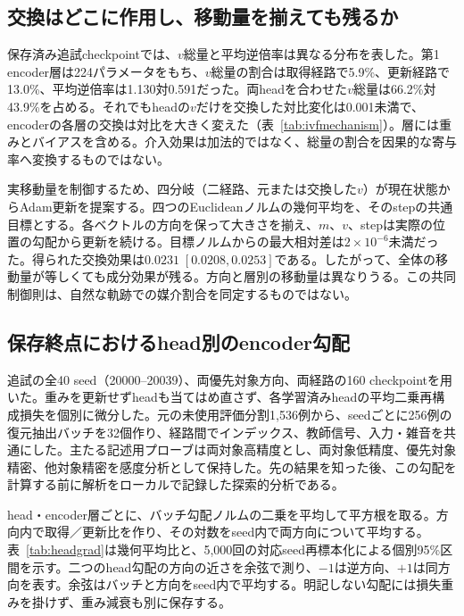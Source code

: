 \subsection{交換はどこに作用し、移動量を揃えても残るか}
保存済み追試checkpointでは、$v$総量と平均逆倍率は異なる分布を表した。第1 encoder層は224パラメータをもち、$v$総量の割合は取得経路で5.9\%、更新経路で13.0\%、平均逆倍率は1.130対0.591だった。両headを合わせた$v$総量は66.2\%対43.9\%を占める。それでもheadの$v$だけを交換した対比変化は0.001未満で、encoderの各層の交換は対比を大きく変えた（表~\ref{tab:ivfmechanism}）。層には重みとバイアスを含める。介入効果は加法的ではなく、総量の割合を因果的な寄与率へ変換するものではない。

実移動量を制御するため、四分岐（二経路、元または交換した$v$）が現在状態からAdam更新を提案する。四つのEuclideanノルムの幾何平均を、そのstepの共通目標とする。各ベクトルの方向を保って大きさを揃え、$m$、$v$、stepは実際の位置の勾配から更新を続ける。目標ノルムからの最大相対差は$2\times10^{-6}$未満だった。得られた交換効果は$0.0231\;[0.0208,0.0253]$である。したがって、全体の移動量が等しくても成分効果が残る。方向と層別の移動量は異なりうる。この共同制御則は、自然な軌跡での媒介割合を同定するものではない。






\subsection{保存終点におけるhead別のencoder勾配}
\label{app:headgrad}
追試の全40 seed（20000--20039）、両優先対象方向、両経路の160 checkpointを用いた。重みを更新せずheadも当てはめ直さず、各学習済みheadの平均二乗再構成損失を個別に微分した。元の未使用評価分割1,536例から、seedごとに256例の復元抽出バッチを32個作り、経路間でインデックス、教師信号、入力・雑音を共通にした。主たる記述用プローブは両対象高精度とし、両対象低精度、優先対象精密、他対象精密を感度分析として保持した。先の結果を知った後、この勾配を計算する前に解析をローカルで記録した探索的分析である。

head・encoder層ごとに、バッチ勾配ノルムの二乗を平均して平方根を取る。方向内で取得／更新比を作り、その対数をseed内で両方向について平均する。表~\ref{tab:headgrad}は幾何平均比と、5,000回の対応seed再標本化による個別95\%区間を示す。二つのhead勾配の方向の近さを余弦で測り、$-1$は逆方向、$+1$は同方向を表す。余弦はバッチと方向をseed内で平均する。明記しない勾配には損失重みを掛けず、重み減衰も別に保存する。

